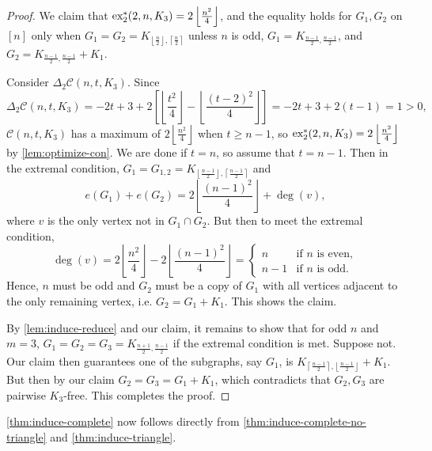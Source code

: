 \documentclass[10pt, reqno]{report}
\newcommand*{\dex}{\textnormal{ex}_2}
\newcommand*{\con}{\mathcal{C}}
\begin{document}
\begin{proof}
  We claim that $\dex^*(2, n, K_3) = 2\left\lfloor\frac{n^2}{4}\right\rfloor$, and the equality holds for $G_1, G_2$ on $[n]$ only when $G_1 = G_2 = K_{\left\lfloor\frac{n}{2}\right\rfloor, \left\lceil\frac{n}{2}\right\rceil}$ unless $n$ is odd, $G_1 = K_{\frac{n - 1}{2}, \frac{n - 1}{2}}$, and $G_2 = K_{\frac{n - 1}{2}, \frac{n - 1}{2}} + K_1$.

  Consider $\Delta_2 \con(n, t, K_3)$. Since
  \[
    \Delta_2 \con(n, t, K_3) = -2t + 3 + 2\left[\left\lfloor\frac{t^2}{4}\right\rfloor - \left\lfloor\frac{(t - 2)^2}{4}\right\rfloor\right] = -2t + 3 + 2(t - 1) = 1 > 0,
  \]
  $\con(n, t, K_3)$ has a maximum of $2\left\lfloor \frac{n^2}{4} \right\rfloor$ when $t \geq n - 1$, so $\dex^*(2, n, K_3) = 2\left\lfloor\frac{n^2}{4}\right\rfloor$ by \cref{lem:optimize-con}. We are done if $t = n$, so assume that $t = n - 1$. Then in the extremal condition, $G_1 = G_{1, 2} = K_{\left\lfloor\frac{n - 1}{2}\right\rfloor, \left\lceil\frac{n - 1}{2}\right\rceil}$ and
  \[
    e(G_1) + e(G_2) = 2\left\lfloor\frac{(n - 1)^2}{4}\right\rfloor + \deg(v),
  \]
  where $v$ is the only vertex not in $G_1 \cap G_2$. But then to meet the extremal condition, 
  \[
    \deg(v) = 2\left\lfloor\frac{n^2}{4}\right\rfloor - 2\left\lfloor\frac{(n - 1)^2}{4}\right\rfloor = \begin{cases}
      n & \text{if $n$ is even}, \\
      n - 1 & \text{if $n$ is odd}.
    \end{cases}
  \]
  Hence, $n$ must be odd and $G_2$ must be a copy of $G_1$ with all vertices adjacent to the only remaining vertex, i.e. $G_2 = G_1 + K_1$. This shows the claim.

  By \cref{lem:induce-reduce} and our claim, it remains to show that for odd $n$ and $m = 3$, $G_1 = G_2 = G_3 = K_{\frac{n + 1}{2}, \frac{n - 1}{2}}$ if the extremal condition is met. Suppose not. Our claim then guarantees one of the subgraphs, say $G_1$, is $K_{\left\lceil\frac{n - 1}{2}\right\rceil, \left\lfloor\frac{n - 1}{2}\right\rfloor} + K_1$. But then by our claim $G_2 = G_3 = G_1 + K_1$, which contradicts that $G_2, G_3$ are pairwise $K_3$-free. This completes the proof.
\end{proof}

\cref{thm:induce-complete} now follows directly from \cref{thm:induce-complete-no-triangle} and \cref{thm:induce-triangle}.

\end{document}
